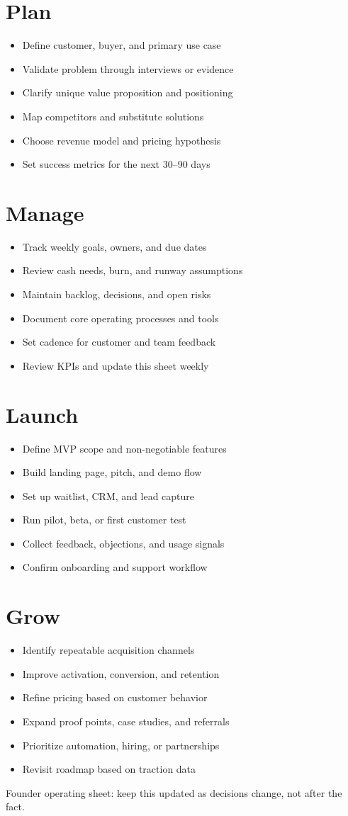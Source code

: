 \documentclass[10pt]{article}
\newcommand{\checkitem}[1]{\item[$\square$] #1}
\begin{document}
\begin{minipage}[t]{0.49\textwidth}
\section*{Plan}
\begin{itemize}
    \checkitem{Define customer, buyer, and primary use case}
    \checkitem{Validate problem through interviews or evidence}
    \checkitem{Clarify unique value proposition and positioning}
    \checkitem{Map competitors and substitute solutions}
    \checkitem{Choose revenue model and pricing hypothesis}
    \checkitem{Set success metrics for the next 30--90 days}
\end{itemize}

\section*{Manage}
\begin{itemize}
    \checkitem{Track weekly goals, owners, and due dates}
    \checkitem{Review cash needs, burn, and runway assumptions}
    \checkitem{Maintain backlog, decisions, and open risks}
    \checkitem{Document core operating processes and tools}
    \checkitem{Set cadence for customer and team feedback}
    \checkitem{Review KPIs and update this sheet weekly}
\end{itemize}
\end{minipage}\hfill
\begin{minipage}[t]{0.49\textwidth}
\section*{Launch}
\begin{itemize}
    \checkitem{Define MVP scope and non-negotiable features}
    \checkitem{Build landing page, pitch, and demo flow}
    \checkitem{Set up waitlist, CRM, and lead capture}
    \checkitem{Run pilot, beta, or first customer test}
    \checkitem{Collect feedback, objections, and usage signals}
    \checkitem{Confirm onboarding and support workflow}
\end{itemize}

\section*{Grow}
\begin{itemize}
    \checkitem{Identify repeatable acquisition channels}
    \checkitem{Improve activation, conversion, and retention}
    \checkitem{Refine pricing based on customer behavior}
    \checkitem{Expand proof points, case studies, and referrals}
    \checkitem{Prioritize automation, hiring, or partnerships}
    \checkitem{Revisit roadmap based on traction data}
\end{itemize}
\end{minipage}

\vfill
{\footnotesize Founder operating sheet: keep this updated as decisions change, not after the fact.}
\end{document}
